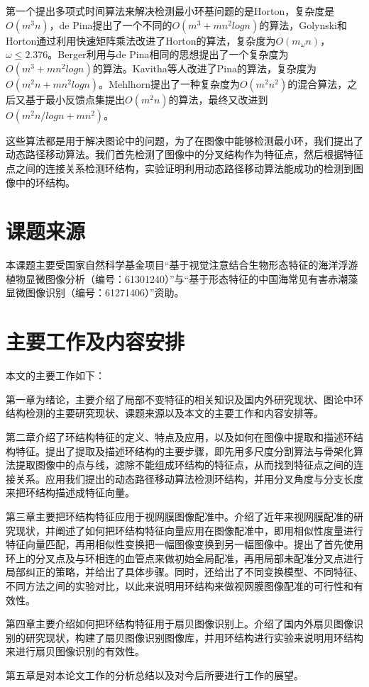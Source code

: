 第一个提出多项式时间算法来解决检测最小环基问题的是Horton\cite{horton}，复杂度是$O(m^3n)$，de Pina\cite{pina}提出了一个不同的$O(m^3+mn^2logn)$的算法，Golynski和Horton\cite{golynski}通过利用快速矩阵乘法改进了Horton的算法，复杂度为$O(m_{\omega}n)$，$\omega \le 2.376$。Berger\cite{berger}利用与de Pina相同的思想提出了一个复杂度为$O(m^3+mn^2logn)$的算法。Kavitha\cite{kavitha}等人改进了Pina的算法，复杂度为$O(m^2n+mn^2logn)$。Mehlhorn\cite{mehlhorn}提出了一种复杂度为$O(m^2n^2)$的混合算法，之后又基于最小反馈点集提出$O(m^2n)$的算法，最终又改进到$O(m^2n/logn + mn^2)$。

这些算法都是用于解决图论中的问题，为了在图像中能够检测最小环，我们提出了动态路径移动算法。我们首先检测了图像中的分叉结构作为特征点，然后根据特征点之间的连接关系检测环结构，实验证明利用动态路径移动算法能成功的检测到图像中的环结构。

\section{课题来源}
\label{sec:theorem}

本课题主要受国家自然科学基金项目“基于视觉注意结合生物形态特征的海洋浮游植物显微图像分析（编号：61301240）”与“基于形态特征的中国海常见有害赤潮藻显微图像识别（编号：61271406）”资助。


\section{主要工作及内容安排}
\label{sec:bib}

本文的主要工作如下：

第一章为绪论，主要介绍了局部不变特征的相关知识及国内外研究现状、图论中环结构检测的主要研究现状、课题来源以及本文的主要工作和内容安排等。

第二章介绍了环结构特征的定义、特点及应用，以及如何在图像中提取和描述环结构特征。提出了提取及描述环结构的主要步骤，即先用多尺度分割算法与骨架化算法提取图像中的点与线，滤除不能组成环结构的特征点，从而找到特征点之间的连接关系。应用我们提出的动态路径移动算法检测环结构，并用分叉角度与分支长度来把环结构描述成特征向量。

第三章主要把环结构特征应用于视网膜图像配准中。介绍了近年来视网膜配准的研究现状，并阐述了如何把环结构特征向量应用在图像配准中，即用相似性度量进行特征向量匹配，再用相似性变换把一幅图像变换到另一幅图像中。提出了首先使用环上的分叉点及与环相连的血管点来做初始全局配准，再用局部未配准分叉点进行局部纠正的策略，并给出了具体步骤。同时，还给出了不同变换模型、不同特征、不同方法之间的实验对比，以此来说明用环结构来做视网膜图像配准的可行性和有效性。

第四章主要介绍如何把环结构特征用于扇贝图像识别上。介绍了国内外扇贝图像识别的研究现状，构建了扇贝图像识别图像库，并用环结构进行实验来说明用环结构来进行扇贝图像识别的有效性。

第五章是对本论文工作的分析总结以及对今后所要进行工作的展望。
